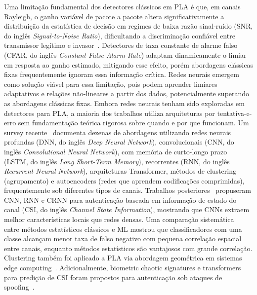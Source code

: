 \documentclass{sbrt}
\begin{document}
Uma limitação fundamental dos detectores clássicos em PLA é que, em canais Rayleigh, o ganho variável de pacote a pacote altera significativamente a distribuição da estatística de decisão em regimes de baixa razão sinal-ruído (SNR, do inglês \textit{Signal-to-Noise Ratio}), dificultando a discriminação confiável entre transmissor legítimo e invasor~\cite{ref_xie}. Detectores de taxa constante de alarme falso (CFAR, do inglês \textit{Constant False Alarm Rate}) adaptam dinamicamente o limiar em resposta ao ganho estimado, mitigando esse efeito, porém abordagens clássicas fixas frequentemente ignoram essa informação crítica. Redes neurais emergem como solução viável para essa limitação, pois podem aprender limiares adaptativos e relações não-lineares a partir dos dados, potencialmente superando as abordagens clássicas fixas. Embora redes neurais tenham sido exploradas em detectores para PLA, a maioria dos trabalhos utiliza arquiteturas por tentativa-e-erro sem fundamentação teórica rigorosa sobre quando e por que funcionam. Um survey recente~\cite{ref_survey_ml_pla} documenta dezenas de abordagens utilizando redes neurais profundas (DNN, do inglês \textit{Deep Neural Network}), convolucionais (CNN, do inglês \textit{Convolutional Neural Network}), com memória de curto-longo prazo (LSTM, do inglês \textit{Long Short-Term Memory}), recorrentes (RNN, do inglês \textit{Recurrent Neural Network}), arquiteturas Transformer, métodos de clustering (agrupamento) e autoencoders (redes que aprendem codificações comprimidas), frequentemente sob diferentes tipos de canais. Trabalhos posteriores~\cite{ref_wang_dnn_csi} propuseram CNN, RNN e CRNN para autenticação baseada em informação de estado do canal (CSI, do inglês \textit{Channel State Information}), mostrando que CNNs extraem melhor características locais que redes densas. Uma comparação sistemática~\cite{ref_comparison_stat_ml} entre métodos estatísticos clássicos e ML mostrou que classificadores com uma classe alcançam menor taxa de falso negativo com pequena correlação espacial entre canais, enquanto métodos estatísticos são vantajosos com grande correlação. Clustering também foi aplicado a PLA via abordagem geométrica em sistemas edge computing~\cite{ref_clustering_pla}. Adicionalmente, biometric chaotic signatures e transformers para predição de CSI foram propostos para autenticação sob ataques de spoofing~\cite{ref_biometric_chaotic, ref_transformer_csi_pred}.
\end{document}
